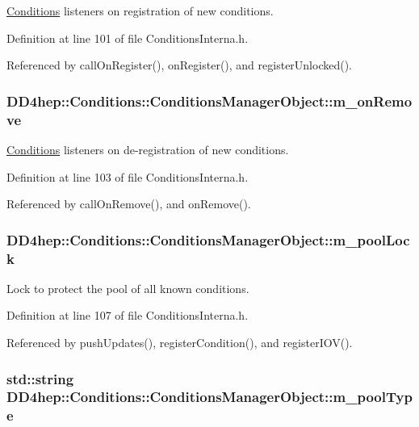 \hyperlink{namespace_d_d4hep_1_1_conditions}{Conditions} listeners on registration of new conditions. 

Definition at line 101 of file ConditionsInterna.h.

Referenced by callOnRegister(), onRegister(), and registerUnlocked().\hypertarget{class_d_d4hep_1_1_conditions_1_1_conditions_manager_object_aa6081a3511680ee1060e78b6a570636d}{
\subsubsection[{m\_\-onRemove}]{ {\bf DD4hep::Conditions::ConditionsManagerObject::m\_\-onRemove}}}
\label{class_d_d4hep_1_1_conditions_1_1_conditions_manager_object_aa6081a3511680ee1060e78b6a570636d}


\hyperlink{namespace_d_d4hep_1_1_conditions}{Conditions} listeners on de-\/registration of new conditions. 

Definition at line 103 of file ConditionsInterna.h.

Referenced by callOnRemove(), and onRemove().\hypertarget{class_d_d4hep_1_1_conditions_1_1_conditions_manager_object_af0a0803e28ed3d30721609a420689e4a}{
\subsubsection[{m\_\-poolLock}]{ {\bf DD4hep::Conditions::ConditionsManagerObject::m\_\-poolLock}}}
\label{class_d_d4hep_1_1_conditions_1_1_conditions_manager_object_af0a0803e28ed3d30721609a420689e4a}


Lock to protect the pool of all known conditions. 

Definition at line 107 of file ConditionsInterna.h.

Referenced by pushUpdates(), registerCondition(), and registerIOV().\hypertarget{class_d_d4hep_1_1_conditions_1_1_conditions_manager_object_acbd30bb422ca98796d1eabf4e17706a2}{
\subsubsection[{m\_\-poolType}]{\setlength{\rightskip}{0pt plus 5cm}std::string {\bf DD4hep::Conditions::ConditionsManagerObject::m\_\-poolType}}}
\label{class_d_d4hep_1_1_conditions_1_1_conditions_manager_object_acbd30bb422ca98796d1eabf4e17706a2}


